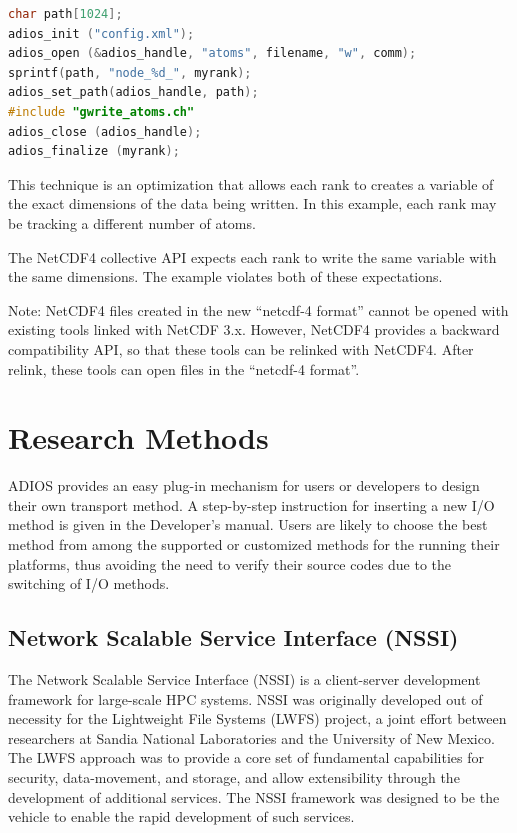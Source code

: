 \begin{lstlisting}[language=C, caption=Example C source]
char path[1024];
adios_init ("config.xml");
adios_open (&adios_handle, "atoms", filename, "w", comm); 
sprintf(path, "node_%d_", myrank); 
adios_set_path(adios_handle, path);
#include "gwrite_atoms.ch" 
adios_close (adios_handle); 
adios_finalize (myrank);
\end{lstlisting}

This technique is an optimization that allows each rank to creates a variable of 
the exact dimensions of the data being written.  In this example, each rank may 
be tracking a different number of atoms.

The NetCDF4 collective API expects each rank to write the same variable with the 
same dimensions.  The example violates both of these expectations.

Note: NetCDF4 files created in the new ``netcdf-4 format'' cannot be opened with 
existing tools linked with NetCDF 3.x.  However, NetCDF4 provides a backward compatibility 
API, so that these tools can be relinked with NetCDF4.  After relink, these tools 
can open files in the ``netcdf-4 format''.


\section{Research Methods}

ADIOS provides an easy plug-in mechanism for users or developers to design their 
own transport method. A step-by-step instruction for inserting a new I/O method 
is given in the Developer's manual. Users are likely to choose the best method from among 
the supported or customized methods for the running their platforms, thus avoiding 
the need to verify their source codes due to the switching of I/O methods.


\subsection{Network Scalable Service Interface (NSSI)}

The Network Scalable Service Interface (NSSI) is a client-server development framework 
for large-scale HPC systems.  NSSI was originally developed out of necessity for 
the Lightweight File Systems (LWFS) project, a joint effort between researchers 
at Sandia National Laboratories and the University of New Mexico.  The LWFS approach 
was to provide a core set of fundamental capabilities for security, data-movement, 
and storage, and allow extensibility through the development of additional services. 
 The NSSI framework was designed to be the vehicle to enable the rapid development 
of such services.


